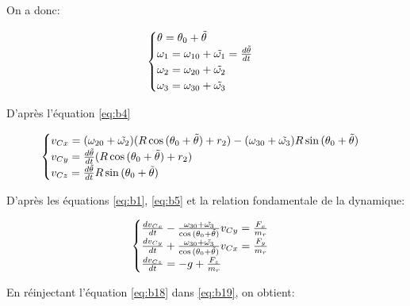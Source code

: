 On a donc:

\begin{equation}
 \begin{cases}
 \theta=\theta_0 + \Tilde{\theta} \\
 \omega_1= \omega_{10} + \Tilde{\omega_1} = \frac{d\Tilde{\theta} }{dt} \\
 \omega_2= \omega_{20} + \Tilde{\omega_2} \\
 \omega_3= \omega_{30} + \Tilde{\omega_3}
 \end{cases}
  \label{eq:b17}
\end{equation}

D'après l'équation \ref{eq:b4}

\begin{equation}
  \begin{cases}
    v_{Cx}=(\omega_{20}+ \Tilde{\omega_2} )(R\cos{(\theta_0 + \Tilde{\theta})}+r_2) -(\omega_{30}+ \Tilde{\omega_3})R\sin{(\theta_0+ \Tilde{\theta})} \\
    v_{Cy} = \frac{d\Tilde{\theta} }{dt} (R\cos{(\theta_0+ \Tilde{\theta})}+r_2)\\
    v_{Cz} = \frac{d\Tilde{\theta} }{dt} R\sin{(\theta_0+ \Tilde{\theta})} 
  \end{cases}
  \label{eq:b18}
\end{equation}

D'après les équations \ref{eq:b1}, \ref{eq:b5} et la relation fondamentale de la dynamique:

\begin{equation}
  \begin{cases}
    \frac{dv_{Cx}}{dt}-\frac{\omega_{30}+ \Tilde{\omega_3}}{\cos{(\theta_0+\Tilde{\theta})}} v_{Cy}= \frac{F_x}{m_r}\\
    \frac{dv_{Cy}}{dt} + \frac{\omega_{30}+ \Tilde{\omega_3}}{\cos{(\theta_0+\Tilde{\theta})}} v_{Cx}= \frac{F_y}{m_r}\\
    \frac{dv_{Cz}}{dt} = - g +\frac{F_z}{m_r}
  \end{cases}
  \label{eq:b19}
\end{equation}

En réinjectant l'équation \ref{eq:b18} dans \ref{eq:b19}, on obtient:


